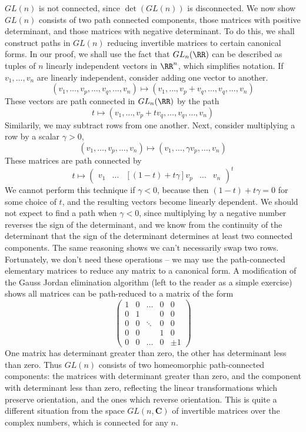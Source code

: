 \begin{example}
    $GL(n)$ is not connected, since $\det(GL(n))$ is disconnected. We now show $GL(n)$ consists of two path connected components, those matrices with positive determinant, and those matrices with negative determinant. To do this, we shall construct paths in $GL(n)$ reducing invertible matrices to certain canonical forms. In our proof, we shall use the fact that $GL_n(\RR)$ can be described as tuples of $n$ linearly independent vectors in $\RR^n$, which simplifies notation. If $v_1, \dots, v_n$ are linearly independent, consider adding one vector to another.
    \[ (v_1, \dots, v_p, \dots, v_q, \dots, v_n) \mapsto (v_1, \dots, v_p + v_q, \dots, v_q, \dots, v_n) \]
    These vectors are path connected in $GL_n(\RR)$ by the path
    \[ t \mapsto (v_1, \dots, v_p + t v_q, \dots, v_q, \dots, v_n) \]
    Similarily, we may subtract rows from one another. Next, consider multiplying a row by a scalar $\gamma > 0$,
    \[ (v_1, \dots, v_p, \dots, v_n) \mapsto (v_1, \dots, \gamma v_p, \dots, v_n) \]
    These matrices are path connected by
    \[ t \mapsto \begin{pmatrix} v_1 & \dots & [(1-t) + t \gamma]v_p & \dots & v_n \end{pmatrix}^t \]
    We cannot perform this technique if $\gamma < 0$, because then $(1-t) + t \gamma = 0$ for some choice of $t$, and the resulting vectors become linearly dependent. We should not expect to find a path when $\gamma < 0$, since multiplying by a negative number reverses the sign of the determinant, and we know from the continuity of the determinant that the sign of the determinant determines at least two connected components. The same reasoning shows we can't necessarily swap two rows. Fortunately, we don't need these operations -- we may use the path-connected elementary matrices to reduce any matrix to a canonical form. A modification of the Gauss Jordan elimination algorithm (left to the reader as a simple exercise) shows all matrices can be path-reduced to a matrix of the form
    \[ \begin{pmatrix} 1 & 0 & \dots & 0 & 0 \\ 0 & 1 & & 0 & 0 \\ 0 & 0 & \ddots & 0 & 0 \\ 0 & 0 &  & 1 & 0 \\ 0 & 0 & \dots & 0 & \pm 1 \end{pmatrix} \]
    One matrix has determinant greater than zero, the other has determinant less than zero. Thus $GL(n)$ consists of two homeomorphic path-connected components: the matrices with determinant greater than zero, and the component with determinant less than zero, reflecting the linear transformations which preserve orientation, and the ones which reverse orientation. This is quite a different situation from the space $GL(n,\mathbf{C})$ of invertible matrices over the complex numbers, which is connected for any $n$.
\end{example}

